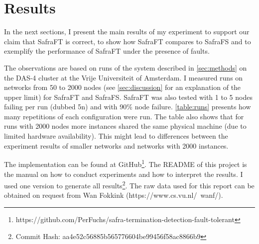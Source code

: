 \section{Results}
\label{sec:results}
In the next sections, I present the main results of my experiment to support our claim that SafraFT is correct, to show how SafraFT compares to SafraFS and to exemplify the performance of SafraFT under the presence of faults.

The observations are based on runs of the system described in \cref{sec:methods} on the DAS-4 cluster at the Vrije Universiteit of Amsterdam.
I measured runs on networks from 50 to 2000 nodes (see \cref{sec:discussion} for an explanation of the upper limit) for SafraFT and SafraFS.
SafraFT was also tested with 1 to 5 nodes failing per run (dubbed 5n) and with 90\% node failure.
\cref{table:runs} presents how many repetitions of each configuration were run.
The table also shows that for runs with 2000 nodes more instances shared the same physical machine (due to limited hardware availability).
This might lead to differences between the experiment results of smaller networks and networks with 2000 instances.

The implementation can be found at GitHub\footnote{https://github.com/PerFuchs/safra-termination-detection-fault-tolerant}.
The README of this project is the manual on how to conduct experiments and how to interpret the results.
I used one version to generate all results\footnote{Commit Hash: aa4e52c56885b565776604be99456f58ac8866b9}.
The raw data used for this report can be obtained on request from Wan Fokkink (https://www.cs.vu.nl/~wanf/).


